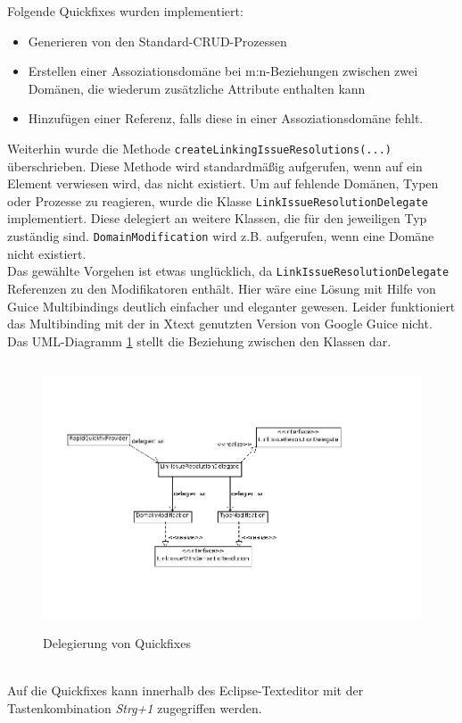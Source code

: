 \documentclass[a4paper,12pt]{scrreprt}
\begin{document}
Folgende Quickfixes wurden implementiert:
\begin{itemize}
	\item Generieren von den Standard-CRUD-Prozessen
	\item Erstellen einer Assoziations\-do\-mäne bei m:n-Beziehungen zwischen zwei Do\-mä\-nen, die wiederum zusätzliche Attribute enthalten kann
	\item Hinzufügen einer Referenz, falls diese in einer Assoziationsdomäne fehlt.
\end{itemize}

Weiterhin wurde die Methode \verb+createLinkingIssueResolutions(...)+ über\-schrie\-ben. Diese Methode wird standardmäßig aufgerufen, wenn auf ein Element verwiesen wird, das nicht existiert. Um auf fehlende Domänen, Typen oder Prozesse zu reagieren, wurde die Klasse \verb+LinkIssueResolutionDelegate+ implementiert. Diese delegiert an weitere Klassen, die für den jeweiligen Typ zuständig sind. \verb+DomainModification+ wird z.B. aufgerufen, wenn eine Domäne nicht existiert.\\
Das gewählte Vorgehen ist etwas unglücklich, da \verb+LinkIssueResolutionDelegate+ Referenzen zu den Modifikatoren enthält. Hier wäre eine Lösung mit Hilfe von Guice Multibindings deutlich einfacher und eleganter gewesen. Leider funktioniert das Multibinding mit der in Xtext genutzten Version von Google Guice nicht. Das UML-Diagramm \ref{fig:link-issue-resolution} stellt die Beziehung zwischen den Klassen dar.
\begin{figure}[h]
	\centering
		\includegraphics[height=300px]{diagramme/link-issue-resolution.png}
		\caption{Delegierung von Quickfixes}
		\label{fig:link-issue-resolution}
\end{figure}\\
Auf die Quickfixes kann innerhalb des Eclipse-Texteditor mit der Tastenkombination \textit{Strg+1} zugegriffen werden.
\end{document}
